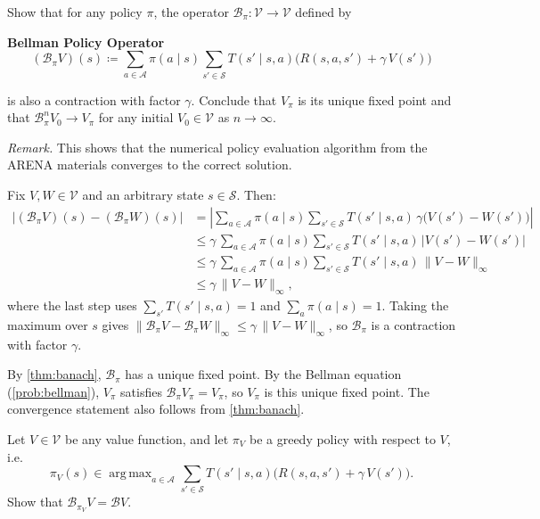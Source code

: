 \documentclass[11pt]{article}
\newcommand{\cS}{\mathcal{S}}
\newcommand{\cA}{\mathcal{A}}
\DeclareMathOperator*{\argmax}{arg\,max}
\begin{document}
\begin{exercise}
\label{prob:Bpi_contraction} Show that for any policy $\pi$, the operator $\mathcal{B}_\pi : \mathcal{V} \to \mathcal{V}$ defined by
\begin{callout}[note]
\textbf{Bellman Policy Operator}
$$
(\mathcal{B}_\pi V)(s) \coloneqq \sum_{a \in \cA} \pi(a \mid s) \sum_{s' \in \cS} T(s' \mid s, a)\bigl(R(s,a,s') + \gamma\, V(s')\bigr)
$$
\end{callout}
is also a contraction with factor $\gamma$. Conclude that $V_\pi$ is its unique fixed point and that $\mathcal{B}^n_{\pi} V_0 \to V_{\pi}$ for any initial $V_0 \in \mathcal{V}$ as $n \to \infty$.

\emph{Remark.} This shows that the numerical policy evaluation algorithm from the ARENA materials converges to the correct solution.
\end{exercise}

\begin{solution}
Fix $V, W \in \mathcal{V}$ and an arbitrary state $s \in \cS$. Then:
\begin{align*}
\big|(\mathcal{B}_\pi V)(s) - (\mathcal{B}_\pi W)(s)\big| &= \left|\sum_{a \in \cA} \pi(a \mid s) \sum_{s' \in \cS} T(s' \mid s, a)\,\gamma\bigl(V(s') - W(s')\bigr)\right| \\
&\le \gamma \,\sum_{a \in \cA} \pi(a \mid s) \sum_{s' \in \cS} T(s' \mid s, a)\,\big|V(s') - W(s')\big| \\
&\le \gamma \, \sum_{a \in \cA} \pi(a \mid s) \sum_{s' \in \cS} T(s' \mid s, a)\,\|V - W\|_\infty\\
&\le \gamma\,\|V - W\|_\infty,
\end{align*}
where the last step uses $\sum_{s'} T(s' \mid s, a) = 1$ and $\sum_a \pi(a \mid s) = 1$. Taking the maximum over $s$ gives $\|\mathcal{B}_\pi V - \mathcal{B}_\pi W\|_\infty \le \gamma\,\|V - W\|_\infty$, so $\mathcal{B}_\pi$ is a contraction with factor $\gamma$.

By \cref{thm:banach}, $\mathcal{B}_\pi$ has a unique fixed point. By the Bellman equation (\cref{prob:bellman}), $V_\pi$ satisfies $\mathcal{B}_\pi V_\pi = V_\pi$, so $V_\pi$ is this unique fixed point.
The convergence statement also follows from \cref{thm:banach}.
\end{solution}


\begin{exercise}
\label{prob:greedy_equals_B} Let $V \in \mathcal{V}$ be any value function, and let $\pi_V$ be a greedy policy with respect to $V$, i.e.\
$$
\pi_V(s) \in \argmax_{a \in \cA} \sum_{s' \in \cS} T(s' \mid s, a)\bigl(R(s,a,s') + \gamma\, V(s')\bigr).
$$
Show that $\mathcal{B}_{\pi_V} V = \mathcal{B} V$.
\end{exercise}
\end{document}
